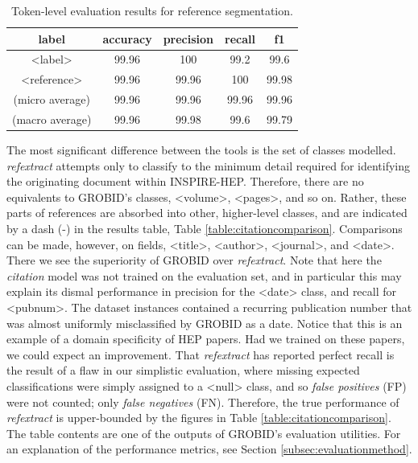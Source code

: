 \begin{table}[h]
\begin{center}
\begin{tabular}{|c|cccc|}
\hline
label           & accuracy  & precision  & recall   & f1 \\
\hline
<label>         & 99.96     & 100        & 99.2     & 99.6\\
<reference>     & 99.96     & 99.96      & 100      & 99.98\\
\hline
(micro average) & 99.96     & 99.96      & 99.96    & 99.96  \\
(macro average) & 99.96     & 99.98      & 99.6     & 99.79  \\
\hline
\end{tabular}
\caption[Token-level evaluation results for reference segmentation.]{Token-level evaluation results for reference segmentation.}
\label{table:referencesegmenterresults}
\end{center}
\end{table}

The most significant difference between the tools is the set of classes modelled. \emph{refextract} attempts only to classify to the minimum detail required for identifying the originating document within INSPIRE-HEP. Therefore, there are no equivalents to GROBID's classes, <volume>, <pages>, and so on. Rather, these parts of references are absorbed into other, higher-level classes, and are indicated by a dash (-) in the results table, Table \ref{table:citationcomparison}. Comparisons can be made, however, on fields, <title>, <author>, <journal>, and <date>. There we see the superiority of GROBID over \emph{refextract}. Note that here the \emph{citation} model was not trained on the evaluation set, and in particular this may explain its dismal performance in precision for the <date> class, and recall for <pubnum>. The dataset instances contained a recurring publication number that was almost uniformly misclassified by GROBID as a date. Notice that this is an example of a domain specificity of HEP papers. Had we trained on these papers, we could expect an improvement. That \emph{refextract} has reported perfect recall is the result of a flaw in our simplistic evaluation, where missing expected classifications were simply assigned to a <null> class, and so \emph{false positives} (FP) were not counted; only \emph{false negatives} (FN). Therefore, the true performance of \emph{refextract} is upper-bounded by the figures in Table \ref{table:citationcomparison}. The table contents are one of the outputs of GROBID's evaluation utilities. For an explanation of the performance metrics, see Section \ref{subsec:evaluationmethod}.

